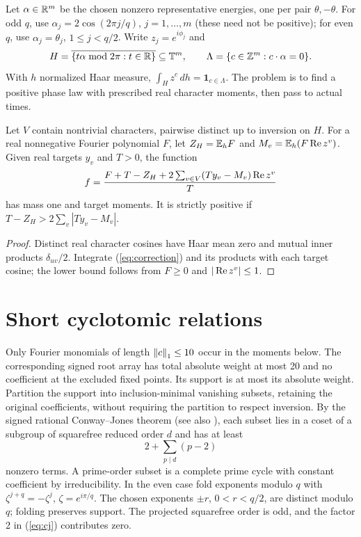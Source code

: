 \documentclass[11pt]{article}
\begin{document}
Let $\alpha\in\mathbb R^m$ be the chosen nonzero representative energies, one per pair $\theta,-\theta$. For odd $q$, use $\alpha_j=2\cos(2\pi j/q)$, $j=1,\dots,m$ (these need not be positive); for even $q$, use $\alpha_j=\theta_j$, $1\le j<q/2$. Write $z_j=e^{i\phi_j}$ and
\begin{equation}H=\overline{\{t\alpha\bmod2\pi:t\in\mathbb R\}}\subseteq\mathbb T^m,\qquad \Lambda=\{c\in\mathbb Z^m:c\cdot\alpha=0\}.\end{equation}
With $h$ normalized Haar measure, $\int_H z^c\,dh=\mathbf1_{c\in\Lambda}$. The problem is to find a positive phase law with prescribed real character moments, then pass to actual times.
\begin{lemma}\label{lem:correction}
Let $V$ contain nontrivial characters, pairwise distinct up to inversion on $H$. For a real nonnegative Fourier polynomial $F$, let $Z_H=\mathbb E_hF$ and $M_v=\mathbb E_h(F\operatorname{Re} z^v)$. Given real targets $y_v$ and $T>0$, the function
\begin{equation}\label{eq:correction}f=\frac{F+T-Z_H+2\sum_{v\in V}(Ty_v-M_v)\operatorname{Re} z^v}{T}\end{equation}
has mass one and target moments. It is strictly positive if $T-Z_H>2\sum_v|Ty_v-M_v|$.
\end{lemma}
\begin{proof}Distinct real character cosines have Haar mean zero and mutual inner products $\delta_{uv}/2$. Integrate (\ref{eq:correction}) and its products with each target cosine; the lower bound follows from $F\ge0$ and $|\operatorname{Re} z^v|\le1$.\end{proof}
\section{Short cyclotomic relations}\label{sec:relations}
Only Fourier monomials of length $\left\|c\right\|_1\le10$ occur in the moments below. The corresponding signed root array has total absolute weight at most 20 and no coefficient at the excluded fixed points. Its support is at most its absolute weight. Partition the support into inclusion-minimal vanishing subsets, retaining the original coefficients, without requiring the partition to respect inversion. By the signed rational Conway--Jones theorem \cite[Theorem 5]{cj} (see also \cite[Theorem 2.6]{lenstra}), each subset lies in a coset of a subgroup of squarefree reduced order $d$ and has at least
\begin{equation}\label{eq:cj}2+\sum_{p\mid d}(p-2)\end{equation}
nonzero terms. A prime-order subset is a complete prime cycle with constant coefficient by irreducibility. In the even case fold exponents modulo $q$ with $\zeta^{j+q}=-\zeta^j$, $\zeta=e^{i\pi/q}$. The chosen exponents $\pm r$, $0<r<q/2$, are distinct modulo $q$; folding preserves support. The projected squarefree order is odd, and the factor 2 in (\ref{eq:cj}) contributes zero.
\end{document}

